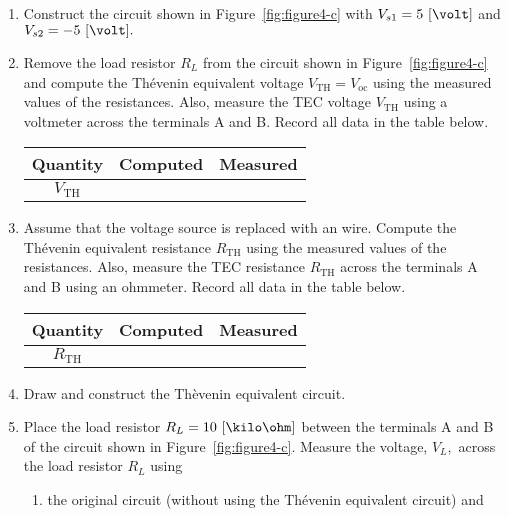 \begin{enumerate}
\begin{enumerate}
  
\item Construct the circuit shown in Figure~\ref{fig:figure4-c} with $V_{s1} = 5~[\volt]$ and $V_{s2} = -5~[\volt].$

  
\item Remove the load resistor $R_L$ from the  circuit shown in Figure~\ref{fig:figure4-c} and compute the Th\'{e}venin equivalent voltage $V_{\mathrm{TH}}=V_{\mathrm{oc}}$ using the measured values of the resistances.  Also, measure the TEC voltage $V_{\mathrm{TH}}$ using a voltmeter across the terminals A and B. Record all data in the table below. %

    
  \begin{center}
    \begin{tabular}{|c|c|c|}
      \toprule
      Quantity & Computed & Measured\\
      \toprule
      $V_{\mathrm{TH}}$ & & \\
      \bottomrule
    \end{tabular}    
  \end{center}
  
\item Assume that the voltage source is replaced with an wire. Compute the Th\'{e}venin equivalent resistance $R_{\mathrm{TH}}$ using the measured values of the resistances.  Also, measure the TEC resistance $R_{\mathrm{TH}}$ across the terminals A and B using an ohmmeter. Record all data in the table below. %
    
   \begin{center}
     \begin{tabular}{|c|c|c|}
       \toprule
       Quantity & Computed & Measured\\
       \toprule
       $R_{\mathrm{TH}}$ & & \\
       \bottomrule
     \end{tabular}     
   \end{center}



   
 \item Draw and construct the Th\`{e}venin equivalent circuit.


 \item Place the load resistor $R_L=10~[\kilo\ohm]$ between the terminals A and B of the circuit shown in Figure~\ref{fig:figure4-c}. Measure the voltage, $V_L,$ across the load resistor $R_L$ using
   \begin{enumerate}
   \item the original circuit (without using the Th\'evenin equivalent circuit) and 
     

\end{enumerate}
\end{enumerate}
\end{enumerate}
